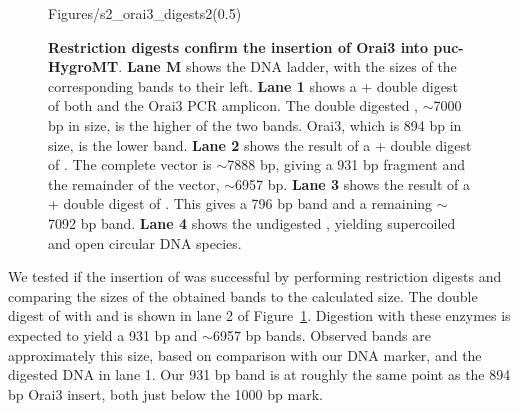 \begin{figure}[ht!]
\begin{center}\vspace{-120pt}
	\begin{lpic}[]{Figures/s2_orai3_digests2(0.5)}
		
	\end{lpic}\vspace{131pt}
	\caption[Restriction digests confirm the insertion of Orai3 into puc-HygroMT]{{\bfseries Restriction digests confirm the insertion of Orai3 into puc-HygroMT}.	
	\textbf{Lane M} shows the DNA ladder, with the sizes of the corresponding bands to their left. 
	\textbf{Lane 1} shows a \sali+\xbai{} double digest of both \puchygmt{} and the Orai3 PCR amplicon. The double digested \puchygmt, $\sim$7000 bp in size, is the higher of the two bands. Orai3, which is 894 bp in size, is the lower band. 
	\textbf{Lane 2} shows the result of a \bamhi+\xhoi{} double digest of \oraiiiivector. The complete vector is $\sim$7888 bp, giving a 931 bp fragment and the remainder of the vector, $\sim$6957 bp. 
	\textbf{Lane 3} shows the result of a \kpni+\xhoi{} double digest of \oraiiiivector. This gives a 796 bp band and a remaining $\sim$7092 bp band.
	\textbf{Lane 4} shows the undigested \oraiiiivector, yielding supercoiled and open circular  DNA species.
	\label{fig:orai3_digests}}
\end{center}
\end{figure}


We tested if the insertion of \oraiiiivector{} was successful by performing restriction digests and  comparing the sizes of the obtained bands to the calculated size.
The double digest of \oraiiiivector{} with \bamhi{} and \xhoi{} is shown in lane 2 of Figure~\ref{fig:orai3_digests}. Digestion with these enzymes is expected to yield a 931 bp and $\sim$6957 bp bands. Observed bands are approximately this size, based on comparison with our DNA marker, and the digested DNA in lane 1. Our 931 bp band is at roughly the same point as the 894 bp Orai3 insert, both just below the 1000 bp mark.

